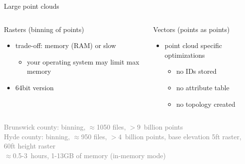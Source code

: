 \documentclass[xcolor={dvipsnames,usenames},beamer,aspectratio=169]{beamer}
\begin{document}
\begin{frame}{Large point clouds}

\begin{columns}
\begin{column}{0.44\textwidth}

Rasters (binning of points)

\begin{itemize}
  \item trade-off: memory (RAM) or slow
  \begin{itemize}
  \item \tiny your operating system may limit max memory
  \end{itemize}
  \item 64bit version
\end{itemize}

\vspace{2.2ex}

\end{column}
\begin{column}{0.44\textwidth}

Vectors (points as points)

\begin{itemize}
  \item point cloud specific optimizations
  \begin{itemize}
  \item no IDs stored
  \item no attribute table
  \item no topology created
  \end{itemize}
\end{itemize}

\end{column}
\end{columns}

\begin{columns}
\begin{column}{0.44\textwidth}

\textcolor{gray}{
\footnotesize
Brunswick county: binning, $\approx$1050 files, $>9$~billion points %
\\
Hyde county: binning, $\approx$950 files, $>4$~billion points, base elevation 5ft raster, 60ft height raster %
\\
$\approx$0.5-3~hours, 1-13GB of memory \tiny (in-memory mode)
}


\end{column}
\end{columns}
\end{frame}
\end{document}

